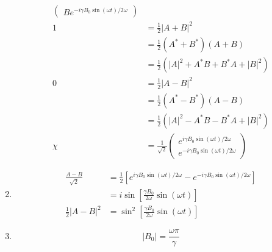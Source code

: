 \documentclass{article}
\begin{document}
\begin{enumerate}
\begin{align*}
\begin{pmatrix}
                                                         B e^{-i \gamma B_0 \sin (\omega t) / 2 \omega}
                                                       \end{pmatrix}                  \\
          1                                        & = \frac{1}{2} |A + B|^2                                                   \\
                                                   & = \frac{1}{2} (A^* + B^*) (A + B)                                         \\
                                                   & = \frac{1}{2} (|A|^2 + A^* B + B^* A + |B|^2)                             \\
          0                                        & = \frac{1}{2} |A - B|^2                                                   \\
                                                   & = \frac{1}{2} (A^* - B^*) (A - B)                                         \\
                                                   & = \frac{1}{2} (|A|^2 - A^* B - B^* A + |B|^2)                             \\
          \chi                                     & = \frac{1}{\sqrt{2}} \begin{pmatrix}
                                                                            e^{i \gamma B_0 \sin (\omega t) / 2 \omega} \\
                                                                            e^{-i \gamma B_0 \sin (\omega t) / 2 \omega}
                                                                          \end{pmatrix}
        \end{align*}

  \item

        \begin{align*}
          \frac{A - B}{\sqrt{2}} & = \frac{1}{2} [e^{i \gamma B_0 \sin (\omega t) / 2 \omega} - e^{-i \gamma B_0 \sin (\omega t) / 2 \omega}] \\
                                 & = i \sin \left[ \frac{\gamma B_0}{2 \omega} \sin (\omega t) \right]                                        \\
          \frac{1}{2} |A - B|^2  & = \sin^2 \left[ \frac{\gamma B_0}{2 \omega} \sin (\omega t) \right]
        \end{align*}

  \item \[|B_0| = \frac{\omega \pi}{\gamma}\]
\end{enumerate}
\end{document}
